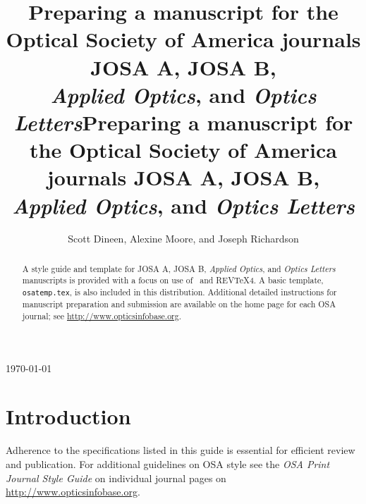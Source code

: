 \documentclass[letterpaper,11pt]{article}   %
\begin{document}
\title{Preparing a manuscript
for the Optical Society of America journals JOSA A, JOSA B, \\
\textit{Applied Optics}, and \textit{Optics Letters}}
\centerline{\today}
\vskip1in
\begin{multicols}{2}
\tableofcontents
\end{multicols}
\pagebreak


\title{Preparing a manuscript
for the Optical Society of America journals JOSA A, JOSA B, \\
\textit{Applied Optics}, and \textit{Optics Letters}}

\author{Scott Dineen, Alexine Moore, and Joseph Richardson}

\address{Optical Society of America, 2010 Massachusetts Avenue, NW, \\
Washington, D.C. 20036} %


\begin{abstract}A style guide and template for JOSA A, JOSA B,
\textit{Applied Optics}, and \textit{Optics Letters} manuscripts
is provided with a focus on use of \LaTeXe\ and REV\TeX{}4. A
basic template, \texttt{osatemp.tex}, is also included in this
distribution. Additional detailed instructions for manuscript
preparation and submission are available on the home page for each
OSA journal; see \mbox{\href{http://www.opticsinfobase.org}{http://www.opticsinfobase.org}}. \\
\end{abstract}


\maketitle %

\section{Introduction}
Adherence to the specifications listed in this guide is essential
for efficient review and publication. For additional guidelines on OSA style see the 
\textit{OSA Print Journal Style Guide} on individual journal pages on  
\mbox{\href{http://www.opticsinfobase.org}{http://www.opticsinfobase.org}}.
\end{document}

